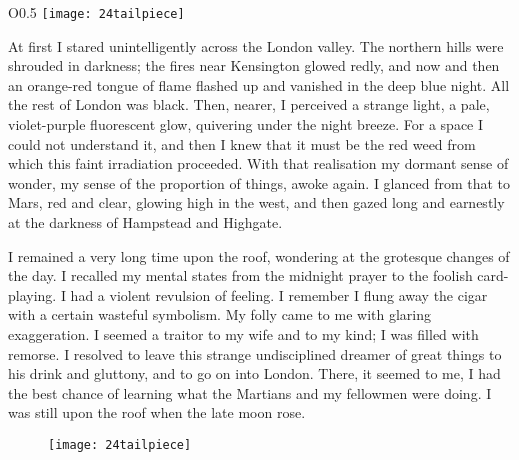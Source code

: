 \begin{a4}
	\begin{wrapfigure}{O}{0.5\textwidth}
		\centering
		\texttt{[image: 24tailpiece]}
	\end{wrapfigure}
\end{a4}

At first I stared unintelligently across the London valley. The northern hills were shrouded in darkness; the fires near Kensington glowed redly, and now and then an orange-red tongue of flame flashed up and vanished in the deep blue night. All the rest of London was black. Then, nearer, I perceived a strange light, a pale, violet-purple fluorescent glow, quivering under the night breeze. For a space I could not understand it, and then I knew that it must be the red weed from which this faint irradiation proceeded. With that realisation my dormant sense of wonder, my sense of the proportion of things, awoke again. I glanced from that to Mars, red and clear, glowing high in the west, and then gazed long and earnestly at the darkness of Hampstead and Highgate.

I remained a very long time upon the roof, wondering at the grotesque changes of the day. I recalled my mental states from the midnight prayer to the foolish card-playing. I had a violent revulsion of feeling. I remember I flung away the cigar with a certain wasteful symbolism. My folly came to me with glaring exaggeration. I seemed a traitor to my wife and to my kind; I was filled with remorse. I resolved to leave this strange undisciplined dreamer of great things to his drink and gluttony, and to go on into London. There, it seemed to me, I had the best chance of learning what the Martians and my fellowmen were doing. I was still upon the roof when the late moon rose.

\begin{letter}
	\begin{figure}[b!]
		\centering
		\texttt{[image: 24tailpiece]}
	\end{figure}
\end{letter}

